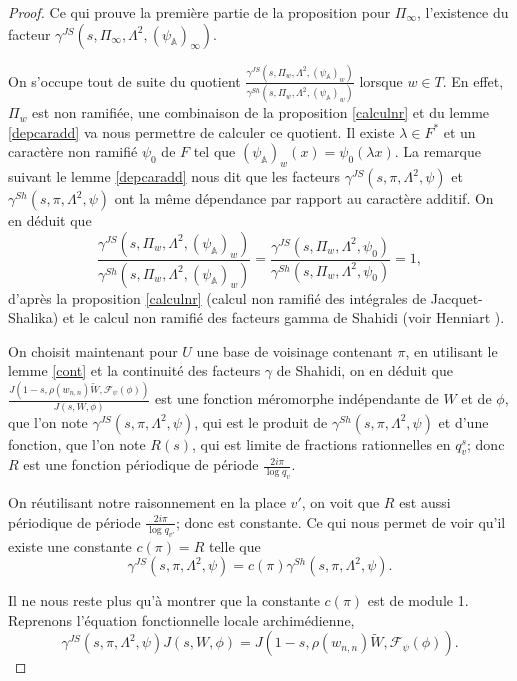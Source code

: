 \documentclass{amsart}
\begin{document}
\begin{proof}
 Ce qui prouve la première partie de la proposition pour $\Pi_\infty$, l'existence du facteur $\gamma^{JS}(s, \Pi_\infty, \Lambda^2, (\psi_\mathbb{A})_\infty)$.
 
 On s'occupe tout de suite du quotient $\frac{\gamma^{JS}(s, \Pi_w, \Lambda^2, (\psi_\mathbb{A})_w)}{\gamma^{Sh}(s, \Pi_w, \Lambda^2, (\psi_\mathbb{A})_w)}$ lorsque $w \in T$. En effet, $\Pi_w$ est non ramifiée, une combinaison de la proposition \ref{calculnr} et du lemme \ref{depcaradd} va nous permettre de calculer ce quotient. Il existe $\lambda \in F^*$ et un caractère non ramifié $\psi_0$ de $F$ tel que $(\psi_\mathbb{A})_w(x) = \psi_0(\lambda x)$. La remarque suivant le lemme \ref{depcaradd} nous dit que les facteurs $\gamma^{JS}(s, \pi, \Lambda^2, \psi)$ et $\gamma^{Sh}(s, \pi, \Lambda^2, \psi)$ ont la même dépendance par rapport au caractère additif. On en déduit que
 \begin{equation}
 \frac{\gamma^{JS}(s, \Pi_w, \Lambda^2, (\psi_\mathbb{A})_w)}{\gamma^{Sh}(s, \Pi_w, \Lambda^2, (\psi_\mathbb{A})_w)} = \frac{\gamma^{JS}(s, \Pi_w, \Lambda^2, \psi_0)}{\gamma^{Sh}(s, \Pi_w, \Lambda^2, \psi_0)} = 1,
 \end{equation}
 d'après la proposition \ref{calculnr} (calcul non ramifié des intégrales de Jacquet-Shalika) et le calcul non ramifié des facteurs gamma de Shahidi (voir Henniart \cite{henniart}).
 
 On choisit maintenant pour $U$ une base de voisinage contenant $\pi$, en utilisant le lemme \ref{cont} et la continuité des facteurs $\gamma$ de Shahidi, on en déduit que $\frac{J(1-s, \rho(w_{n,n})\tilde{W}, \mathcal{F}_\psi(\phi))}{J(s, W, \phi)}$
 est une fonction méromorphe indépendante de $W$ et de $\phi$, que l'on note $\gamma^{JS}(s, \pi, \Lambda^2, \psi)$, qui est le produit de $\gamma^{Sh}(s, \pi, \Lambda^2, \psi)$ et d'une fonction, que l'on note $R(s)$, qui est limite de fractions rationnelles en $q_v^s$; donc $R$ est une fonction périodique de période $\frac{2i\pi}{\log q_v}$.
 
  On réutilisant notre raisonnement en la place $v'$, on voit que $R$ est aussi périodique de période $\frac{2i\pi}{\log q_{v'}}$; donc est constante. Ce qui nous permet de voir qu'il existe une constante $c(\pi)=R$ telle que
 \begin{equation}
 \gamma^{JS}(s, \pi, \Lambda^2, \psi) = c(\pi)\gamma^{Sh}(s, \pi, \Lambda^2, \psi).
 \end{equation}
 
 Il ne nous reste plus qu'à montrer que la constante $c(\pi)$ est de module 1. Reprenons l'équation fonctionnelle locale archimédienne,
 \begin{equation}
 \label{funcarch}
 \gamma^{JS}(s, \pi, \Lambda^2, \psi) J(s, W, \phi) = J(1-s, \rho(w_{n,n})\tilde{W}, \mathcal{F}_\psi(\phi)).
 \end{equation}
 

\end{proof}
\end{document}
